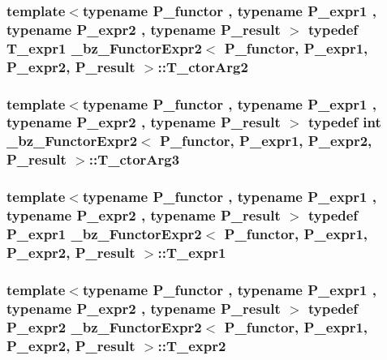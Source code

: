 \subsubsection[{T\+\_\+ctor\+Arg2}]{\setlength{\rightskip}{0pt plus 5cm}template$<$typename P\+\_\+functor , typename P\+\_\+expr1 , typename P\+\_\+expr2 , typename P\+\_\+result $>$ typedef {\bf T\+\_\+expr1} {\bf \+\_\+bz\+\_\+\+Functor\+Expr2}$<$ P\+\_\+functor, P\+\_\+expr1, P\+\_\+expr2, P\+\_\+result $>$\+::{\bf T\+\_\+ctor\+Arg2}}\label{class__bz__FunctorExpr2_aec9632e49bce5ab5259447ba414f4726}
\hypertarget{class__bz__FunctorExpr2_a6292f3b71ec0ff6e3bddc108ecea849c}{}
\subsubsection[{T\+\_\+ctor\+Arg3}]{\setlength{\rightskip}{0pt plus 5cm}template$<$typename P\+\_\+functor , typename P\+\_\+expr1 , typename P\+\_\+expr2 , typename P\+\_\+result $>$ typedef int {\bf \+\_\+bz\+\_\+\+Functor\+Expr2}$<$ P\+\_\+functor, P\+\_\+expr1, P\+\_\+expr2, P\+\_\+result $>$\+::{\bf T\+\_\+ctor\+Arg3}}\label{class__bz__FunctorExpr2_a6292f3b71ec0ff6e3bddc108ecea849c}
\hypertarget{class__bz__FunctorExpr2_ab18a816b647c4ec928bdd1b61646abfd}{}
\subsubsection[{T\+\_\+expr1}]{\setlength{\rightskip}{0pt plus 5cm}template$<$typename P\+\_\+functor , typename P\+\_\+expr1 , typename P\+\_\+expr2 , typename P\+\_\+result $>$ typedef P\+\_\+expr1 {\bf \+\_\+bz\+\_\+\+Functor\+Expr2}$<$ P\+\_\+functor, P\+\_\+expr1, P\+\_\+expr2, P\+\_\+result $>$\+::{\bf T\+\_\+expr1}}\label{class__bz__FunctorExpr2_ab18a816b647c4ec928bdd1b61646abfd}
\hypertarget{class__bz__FunctorExpr2_af1371d32263c82261e4b24f3229af6ee}{}
\subsubsection[{T\+\_\+expr2}]{\setlength{\rightskip}{0pt plus 5cm}template$<$typename P\+\_\+functor , typename P\+\_\+expr1 , typename P\+\_\+expr2 , typename P\+\_\+result $>$ typedef P\+\_\+expr2 {\bf \+\_\+bz\+\_\+\+Functor\+Expr2}$<$ P\+\_\+functor, P\+\_\+expr1, P\+\_\+expr2, P\+\_\+result $>$\+::{\bf T\+\_\+expr2}}\label{class__bz__FunctorExpr2_af1371d32263c82261e4b24f3229af6ee}
\hypertarget{class__bz__FunctorExpr2_a3fe23ec6c06a2346710d4590986bc1ae}{}
